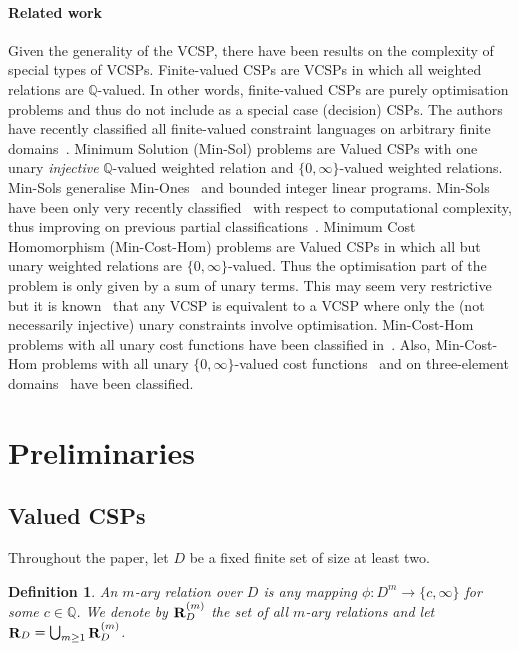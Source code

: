 \documentclass[11pt, reqno]{article}
\DeclareMathOperator{\rel}{{\bf R}}
\newtheorem{definition}{Definition}
\theoremstyle{remark}
\begin{document}
\paragraph{Related work}
%
Given the generality of the VCSP, there have been results on the complexity of
special types of VCSPs. Finite-valued CSPs are VCSPs in which all weighted
relations are $\mathbb{Q}$-valued. In other words, finite-valued CSPs are purely
optimisation problems and thus do not include as a special case (decision) CSPs.
The authors have
recently classified all finite-valued constraint languages on arbitrary finite
domains~\cite{tz13:stoc}. Minimum Solution (Min-Sol) problems are Valued CSPs
with one unary \emph{injective} $\mathbb{Q}$-valued weighted relation and
$\{0,\infty\}$-valued weighted relations. Min-Sols generalise
Min-Ones~\cite{Creignouetal:siam01} and bounded integer linear programs.
Min-Sols have been only very recently classified~\cite{tz15:icalp} with respect
to computational complexity, thus improving on previous partial
classifications~\cite{Khanna01:approximability,Uppman13:icalp,Jonsson07:maxsol,Jonsson08:max-sol,Jonsson08:siam}.
Minimum Cost Homomorphism (Min-Cost-Hom) problems are Valued CSPs in which all
but unary weighted relations are $\{0,\infty\}$-valued. Thus the optimisation
part of the problem is only given by a sum of unary terms. This may seem very
restrictive but it is known~\cite{ccjz15:aaai,Powell15:arxiv} 
that any VCSP is equivalent to a VCSP where only the
(not necessarily injective) unary constraints involve optimisation. Min-Cost-Hom
problems with all unary cost functions have been classified
in~\cite{Takhanov10:stacs}. Also, Min-Cost-Hom problems with all unary
$\{0,\infty\}$-valued cost functions~\cite{Takhanov10:cocoon,Uppman13:icalp} and
on three-element domains~\cite{Uppman14:stacs} have been classified.

\section{Preliminaries}
\label{sec:prelim}

\subsection{Valued CSPs}

Throughout the paper, let $D$ be a fixed finite set of size at least two.

\begin{definition}\label{def:rel}
An $m$-ary \emph{relation} over $D$ is any mapping $\phi:D^m\to\{c,\infty\}$ for
some $c\in\mathbb{Q}$.
We denote by $\rel_D^{(m)}$ the set of all $m$-ary relations and let
$\rel_D=\bigcup_{m\geq 1}{\rel_D^{(m)}}$.
\end{definition}
\end{document}
